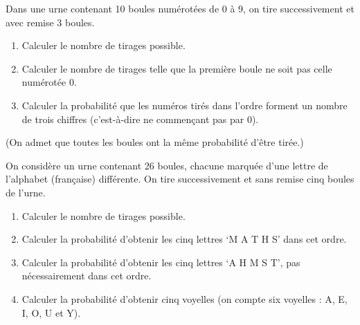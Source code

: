             \begin{exe}\label{exe:proba-cours-3}
                        Dans une urne contenant 10 boules num\'erot\'ees de 0 \`a 9,
                        on tire successivement et avec remise 3 boules.
                        \begin{enumerate}
                              \item Calculer le nombre de tirages possible.
                              \item Calculer le nombre de tirages telle que 
                                    la premi\`ere boule ne soit pas celle num\'erot\'ee 0.
                              \item Calculer la probabilit\'e que les num\'eros tir\'es dans l'ordre
                                    forment un nombre de trois chiffres
                                    (c'est-\`a-dire ne commen\c{c}ant pas par 0).
                        \end{enumerate}
                        (On admet que toutes les boules ont la m\^eme probabilit\'e d'\^etre tir\'ee.)
            \end{exe}
            \begin{exe}\label{exe:proba-cours-4}
                        On consid\`ere un urne contenant 26 boules,
                        chacune marqu\'ee d'une lettre de l'alphabet (fran\c{c}aise) diff\'erente.
                        On tire successivement et sans remise cinq boules de l'urne.
                        \begin{enumerate}
                              \item Calculer le nombre de tirages possible.
                              \item Calculer la probabilit\'e d'obtenir les cinq lettres `M A T H S' dans cet ordre.
                              \item Calculer la probabilit\'e d'obtenir les cinq lettres `A H M S T',
                                    pas n\'ecessairement dans cet ordre.
                              \item Calculer la probabilit\'e d'obtenir cinq voyelles (on compte six voyelles : A, E, I, O, U et Y).
                        \end{enumerate}
            \end{exe}
